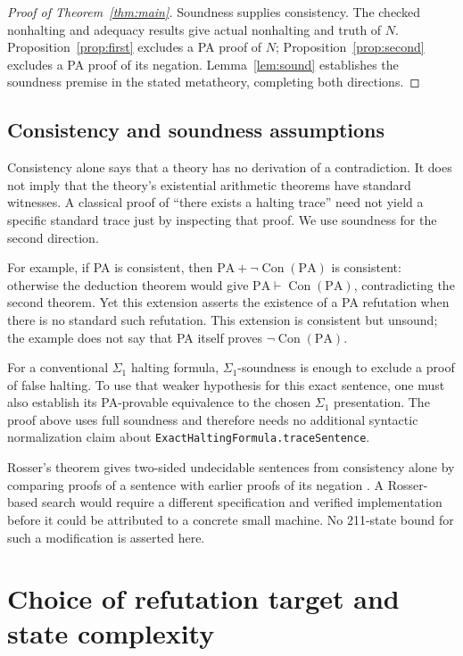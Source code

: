 \documentclass[11pt,letterpaper]{article}
\newcommand{\PA}{\mathrm{PA}}
\newcommand{\Con}{\operatorname{Con}}
\begin{document}
\begin{proof}[Proof of Theorem~\ref{thm:main}]
Soundness supplies consistency. The checked nonhalting and adequacy
results give actual nonhalting and truth of $N$.
Proposition~\ref{prop:first} excludes a PA proof of $N$;
Proposition~\ref{prop:second} excludes a PA proof of its negation.
Lemma~\ref{lem:sound} establishes the soundness premise in the stated
metatheory, completing both directions.
\end{proof}

\subsection{Consistency and soundness assumptions}

Consistency alone says that a theory has no derivation of a contradiction.
It does not imply that the theory's existential arithmetic theorems have
standard witnesses. A classical proof of ``there exists
a halting trace'' need not yield a specific standard trace just by
inspecting that proof. We use soundness for the second direction.

For example, if PA is consistent, then
$\PA+\neg\Con(\PA)$ is consistent: otherwise the deduction theorem
would give $\PA\vdash\Con(\PA)$, contradicting the second theorem.
Yet this extension asserts the existence of a PA refutation when there
is no standard such refutation. This extension is consistent but unsound;
the example does not say that PA itself proves $\neg\Con(\PA)$.

For a conventional $\Sigma_1$ halting formula, $\Sigma_1$-soundness is
enough to exclude a proof of false halting. To use that weaker hypothesis
for this exact sentence, one must also establish its PA-provable
equivalence to the chosen $\Sigma_1$ presentation. The proof above uses
full soundness and therefore needs no additional syntactic normalization
claim about \texttt{ExactHaltingFormula.traceSentence}.

Rosser's theorem gives two-sided undecidable sentences from consistency
alone by comparing proofs of a sentence with earlier proofs of its
negation \cite{rosser}. A Rosser-based search would require a different
specification and verified implementation before it could be attributed
to a concrete small machine. No 211-state bound for such a modification
is asserted here.

\section{Choice of refutation target and state complexity}\label{sec:zero-one}
\end{document}
